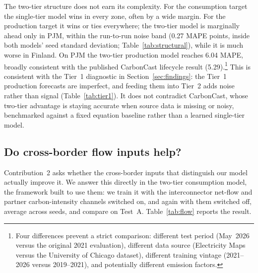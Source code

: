 \documentclass[sigconf,nonacm,a4paper]{acmart}  %
\begin{document}
The two-tier structure does not earn its complexity. For the consumption target
the single-tier model wins in every zone, often by a wide margin. For the
production target it wins or ties everywhere; the two-tier model is marginally
ahead only in PJM, within the run-to-run noise band (0.27 MAPE points, inside both
models' seed standard deviation; Table~\ref{tab:structural}), while it is
much worse in Finland. On PJM the two-tier production model reaches 6.04 MAPE,
broadly consistent with the published CarbonCast lifecycle result (5.29).\footnote{Four differences prevent a strict comparison: different test period (May~2026 versus the original 2021 evaluation), different data source (Electricity Maps versus the University of Chicago dataset), different training vintage (2021--2026 versus 2019--2021), and potentially different emission factors.} This is consistent with the Tier~1 diagnostic in
Section~\ref{sec:findings}: the Tier~1 production forecasts are imperfect, and
feeding them into Tier~2 adds noise rather than signal (Table~\ref{tab:tier1}). It
does not contradict CarbonCast, whose two-tier advantage is staying accurate when
source data is missing or noisy, benchmarked against a fixed equation baseline
rather than a learned single-tier model.


\subsection{Do cross-border flow inputs help?}
\label{sec:flowcompare}
Contribution~2 asks whether the cross-border inputs that distinguish our model
actually improve it. We answer this directly in the two-tier consumption model, the
framework built to use them: we train it with the interconnector net-flow and partner
carbon-intensity channels switched on, and again with them switched off, average
across seeds, and compare on Test~A. Table~\ref{tab:flow} reports the result.
\end{document}
